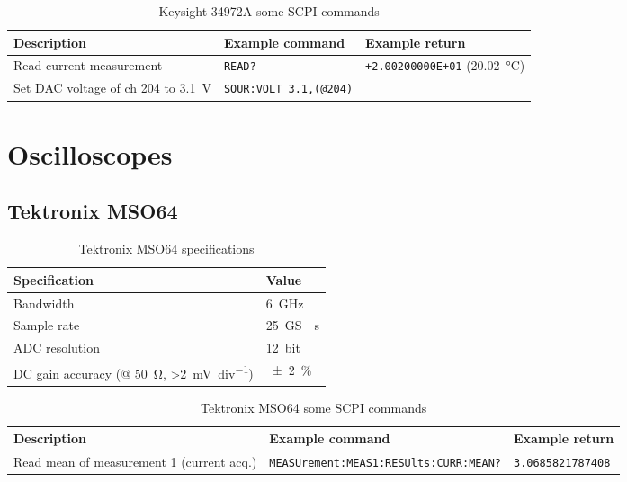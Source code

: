 \begin{table}[H]
	\centering
	\caption{Keysight 34972A some SCPI commands}
	\label{tab:keysight-34972A-scpi}
	\begin{tabularx}{\textwidth}{Xll}
		\toprule
		\textbf{Description} & \textbf{Example command} & \textbf{Example return}\\
		\midrule
		Read current measurement & \texttt{READ?} & \texttt{+2.00200000E+01} (\SI{20.02}{\degreeCelsius})\\
		Set DAC voltage of ch 204 to \SI{3.1}{\volt} & \texttt{SOUR:VOLT 3.1,(@204)} & \\
		\bottomrule
	\end{tabularx}
\end{table}


\section{Oscilloscopes}
\subsection{Tektronix MSO64}
\begin{table}[H]
	\centering
	\caption{Tektronix MSO64 specifications}
	\label{tab:tektronix-MSO64-specs}
	\begin{tabular}{ll}
		\toprule
		\textbf{Specification} & \textbf{Value}\\
		\midrule
		Bandwidth & \SI{6}{\GHz} \\
		Sample rate & \SI{25}{\giga S \per\second}\\
		ADC resolution & \SI{12}{bit}\\
		DC gain accuracy (@ \SI{50}{\ohm}, >\SI{2}{\mV\per div}) & \SI{+-2}{\percent}\\
		\bottomrule
	\end{tabular}
\end{table}

\begin{table}[H]
	\centering
	\caption{Tektronix MSO64 some SCPI commands}
	\label{tab:tektronix-MSO64-scpi}
	\begin{tabularx}{\textwidth}{Xll}
		\toprule
		\textbf{Description} & \textbf{Example command} & \textbf{Example return}\\
		\midrule
		Read mean of measurement 1 (current acq.) & \texttt{MEASUrement:MEAS1:RESUlts:CURR:MEAN?} & \texttt{3.0685821787408} \\
		\bottomrule
	\end{tabularx}
\end{table}

